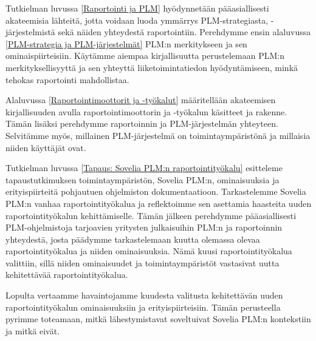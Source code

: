 

Tutkielman luvussa \ref{Raportointi ja PLM} hyödynnetään pääasiallisesti akateemisia lähteitä, jotta voidaan luoda ymmärrys PLM-strategiasta, -järjestelmistä sekä näiden yhteydestä raportointiin. Perehdymme ensin alaluvussa \ref{PLM-strategia ja PLM-järjestelmät} PLM:n merkitykseen ja sen ominaispiirteisiin. Käytämme aiempaa kirjallisuutta perustelemaan PLM:n merkityksellisyyttä ja sen yhteyttä liiketoimintatiedon hyödyntämiseen, minkä tehokas raportointi mahdollistaa.

Alaluvussa \ref{Raportointimoottorit ja -työkalut} määritellään akateemisen kirjallisuuden avulla raportointimoottorin ja -työkalun käsitteet ja rakenne. Tämän lisäksi perehdymme raportoinnin ja PLM-järjestelmän yhteyteen. Selvitämme myös, millainen PLM-järjestelmä on toimintaympäristönä ja millaisia niiden käyttäjät ovat.

Tutkielman luvussa \ref{Tapaus: Sovelia PLM:n raportointityökalu} esitteleme tapaustutkimuksen toimintaympäristön, Sovelia PLM:n, ominaisuuksia ja erityispiirteitä pohjautuen ohjelmiston dokumentaatioon. Tarkastelemme Sovelia PLM:n vanhaa raportointityökalua ja reflektoimme sen asettamia haasteita uuden raportointityökalun kehittämiselle. Tämän jälkeen perehdymme pääasiallisesti PLM-ohjelmistoja tarjoavien yritysten julkaisuihin PLM:n ja raportoinnin yhteydestä, josta päädymme tarkastelemaan kuutta olemassa olevaa raportointityökalua ja niiden ominaisuuksia. Nämä kuusi raportointityökalua valittiin, sillä niiden ominaisuudet ja toimintaympäristöt vastasivat uutta kehitettävää raportointityökalua.

Lopulta vertaamme havaintojamme kuudesta valitusta kehitettävän uuden raportointityökalun ominaisuuksiin ja erityispiirteisiin. Tämän perusteella pyrimme toteamaan, mitkä lähestymistavat soveltuivat Sovelia PLM:n kontekstiin ja mitkä eivät.

